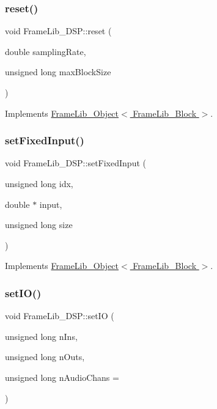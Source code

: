 \subsubsection{\texorpdfstring{reset()}{reset()}}
{\footnotesize\ttfamily void Frame\+Lib\+\_\+\+D\+S\+P\+::reset (\begin{DoxyParamCaption}\item[{double}]{sampling\+Rate,  }\item[{unsigned long}]{max\+Block\+Size }\end{DoxyParamCaption})\hspace{0.3cm}{\ttfamily [virtual]}}



Implements \hyperlink{class_frame_lib___object_aeb02311ab422dd569aeb982e31a66893}{Frame\+Lib\+\_\+\+Object$<$ Frame\+Lib\+\_\+\+Block $>$}.

\mbox{\label{class_frame_lib___d_s_p_ad15333614446257796e75db254efac78}} 
\subsubsection{\texorpdfstring{set\+Fixed\+Input()}{setFixedInput()}}
{\footnotesize\ttfamily void Frame\+Lib\+\_\+\+D\+S\+P\+::set\+Fixed\+Input (\begin{DoxyParamCaption}\item[{unsigned long}]{idx,  }\item[{double $\ast$}]{input,  }\item[{unsigned long}]{size }\end{DoxyParamCaption})\hspace{0.3cm}{\ttfamily [virtual]}}



Implements \hyperlink{class_frame_lib___object_a0d3bed42a21ebf248366f4457722beff}{Frame\+Lib\+\_\+\+Object$<$ Frame\+Lib\+\_\+\+Block $>$}.

\mbox{\label{class_frame_lib___d_s_p_a3d184baeb7b55fa099cb9c4a7393c70c}} 
\subsubsection{\texorpdfstring{set\+I\+O()}{setIO()}}
{\footnotesize\ttfamily void Frame\+Lib\+\_\+\+D\+S\+P\+::set\+IO (\begin{DoxyParamCaption}\item[{unsigned long}]{n\+Ins,  }\item[{unsigned long}]{n\+Outs,  }\item[{unsigned long}]{n\+Audio\+Chans = {} }\end{DoxyParamCaption})\hspace{0.3cm}{\ttfamily [protected]}}

